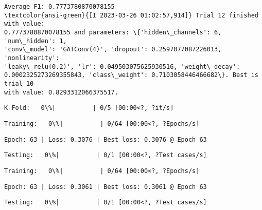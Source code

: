\documentclass[11pt]{article}
\begin{document}
    
    \begin{Verbatim}[commandchars=\\\{\}]
Average F1: 0.7773780870078155
\textcolor{ansi-green}{[I 2023-03-26 01:02:57,914]} Trial 12 finished with value:
0.7773780870078155 and parameters: \{'hidden\_channels': 6, 'num\_hidden': 1,
'conv\_model': 'GATConv(4)', 'dropout': 0.2597077087226013, 'nonlinearity':
'leaky\_relu(0.2)', 'lr': 0.049503075625930516, 'weight\_decay':
0.0002325273269355843, 'class\_weight': 0.7103058446466682\}. Best is trial 10
with value: 0.8293312066375517.
    \end{Verbatim}

    
    \begin{Verbatim}[commandchars=\\\{\}]
K-Fold:   0\%|          | 0/5 [00:00<?, ?it/s]
    \end{Verbatim}

    
    
    \begin{Verbatim}[commandchars=\\\{\}]
Training:   0\%|          | 0/64 [00:00<?, ?Epochs/s]
    \end{Verbatim}

    
    \begin{Verbatim}[commandchars=\\\{\}]
Epoch: 63 | Loss: 0.3076 | Best loss: 0.3076 @ Epoch 63
    \end{Verbatim}

    
    \begin{Verbatim}[commandchars=\\\{\}]
Testing:   0\%|          | 0/1 [00:00<?, ?Test cases/s]
    \end{Verbatim}

    
    
    \begin{Verbatim}[commandchars=\\\{\}]
Training:   0\%|          | 0/64 [00:00<?, ?Epochs/s]
    \end{Verbatim}

    
    \begin{Verbatim}[commandchars=\\\{\}]
Epoch: 63 | Loss: 0.3061 | Best loss: 0.3061 @ Epoch 63
    \end{Verbatim}

    
    \begin{Verbatim}[commandchars=\\\{\}]
Testing:   0\%|          | 0/1 [00:00<?, ?Test cases/s]
    \end{Verbatim}
\end{document}
